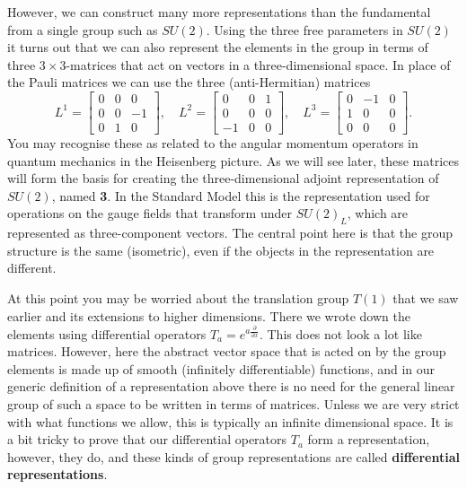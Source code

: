\documentclass[notes.tex]{subfiles}
\begin{document}
However, we can construct many more representations than the fundamental from a single group such as $SU(2)$. Using the three free parameters in $SU(2)$ it turns out that we can also represent the elements in the group in terms of three  $3\times3$-matrices that act on vectors in a three-dimensional space. In place of the Pauli matrices we can use the three (anti-Hermitian) matrices
\begin{equation}
L^1 =\left[\begin{matrix} 0 & 0 & 0 \\ 0 & 0 & -1 \\ 0 & 1 & 0  \end{matrix}\right], 
\quad L^2 =\left[\begin{matrix} 0 & 0 & 1 \\ 0 & 0 & 0 \\ -1 & 0 & 0  \end{matrix}\right], 
\quad L^3 =\left[\begin{matrix} 0 & -1 & 0 \\ 1 & 0 & 0 \\ 0 & 0 & 0  \end{matrix}\right].
\label{eq:SO3_generators}
\end{equation}
You may recognise these as related to the angular momentum operators in quantum mechanics in the Heisenberg picture. As we will see later, these matrices will form the basis for creating the three-dimensional adjoint representation of $SU(2)$, named {\bf 3}. In the Standard Model this is the representation used for operations on the gauge fields that transform under $SU(2)_L$, which are represented as three-component vectors. The central point here is that the group structure is the same (isometric), even if the objects in the representation are different.

At this point you may be worried about the translation group $T(1)$ that we saw earlier and its extensions to higher dimensions. There we wrote down the elements using differential operators $T_a=e^{a\frac{\partial}{\partial x}}$. This does not look a lot like matrices. However, here the abstract vector space that is acted on by the group elements is made up of smooth (infinitely differentiable) functions, and in our generic definition of a representation above there is no need for the general linear group of such a space to be written in terms of matrices. Unless we are very strict with what functions we allow, this is typically an infinite dimensional space. It is a bit tricky to prove that our differential operators $T_a$ form a representation, however, they do, and these kinds of group representations are called {\bf differential representations}.
\end{document}
